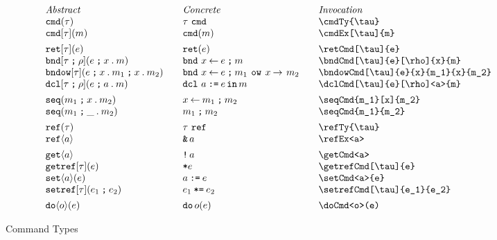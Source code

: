 \documentclass[11pt]{article}
\begin{document}
\begin{figure}

  \begin{small}
    \begin{displaymath}
      \begin{array}{l@{\qquad}l@{\qquad}l@{\qquad}l}
        \textit{Abstract} & \textit{Concrete} & \textit{Invocation} \\
        \cmdTy{\tau}               & \cmdTy*{\tau}               & \verb|\cmdTy{\tau}|               \\
        \cmdEx[\tau]{m}            & \cmdEx*{m}                  & \verb|\cmdEx[\tau]{m}|            \\[1ex]
        \retCmd[\tau]{e}           & \retCmd*{e}                 & \verb|\retCmd[\tau]{e}|           \\
        \bndCmd[\tau]{e}[\rho]{x}{m}           & \bndCmd*{e}{x}{m}           & \verb|\bndCmd[\tau]{e}[\rho]{x}{m}|           \\
        \bndowCmd[\tau]{e}{x}{m_1}{x}{m_2}     & \bndowCmd*{e}{x}{m_1}{x}{m_2}  & \verb|\bndowCmd[\tau]{e}{x}{m_1}{x}{m_2}| \\
        \dclCmd[\tau]{e}[\rho]<a>{m}           & \dclCmd*{e}<a>{m}           & \verb|\dclCmd[\tau]{e}[\rho]<a>{m}|           \\[1ex]
        \seqCmd{m_1}[x]{m_2}       & \seqCmd*{m_1}[x]{m_2}          & \verb|\seqCmd{m_1}[x]{m_2}| \\
        \seqCmd{m_1}{m_2}          & \seqCmd*{m_1}{m_2}          & \verb|\seqCmd{m_1}{m_2}| \\[1ex]
        \refTy{\tau}               & \refTy*{\tau}               & \verb|\refTy{\tau}| \\
        \refEx<a>                  & \refEx*<a>                 & \verb|\refEx<a>|                  \\[1ex]
        \getCmd<a>                 & \getCmd*<a>                 & \verb|\getCmd<a>|                 \\
        \getrefCmd[\tau]{e}        & \getrefCmd*{e}              & \verb|\getrefCmd[\tau]{e}|        \\
        \setCmd<a>{e}              & \setCmd*<a>{e}              & \verb|\setCmd<a>{e}|              \\
        \setrefCmd[\tau]{e_1}{e_2} & \setrefCmd*[\tau]{e_1}{e_2} & \verb|\setrefCmd[\tau]{e_1}{e_2}|  \\[1ex]
        \doCmd<o>(e)               & \doCmd*<o>(e)               & \verb|\doCmd<o>(e)|
      \end{array}
    \end{displaymath}
  \end{small}

  \caption{Command Types}
  \label{fig:cmd}
\end{figure}
\end{document}

